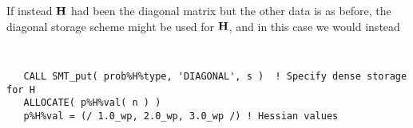\documentclass{galahad}
\begin{document}
If instead ${\mathbf{H}}$ had been the diagonal matrix
but the other data is as before, the diagonal storage scheme
might be used for ${\mathbf{H}}$, and in this case we would instead
{\tt \small
\begin{verbatim}
   CALL SMT_put( prob%H%type, 'DIAGONAL', s )  ! Specify dense storage for H
   ALLOCATE( p%H%val( n ) )
   p%H%val = (/ 1.0_wp, 2.0_wp, 3.0_wp /) ! Hessian values
\end{verbatim}
}
\noindent
\end{document}
